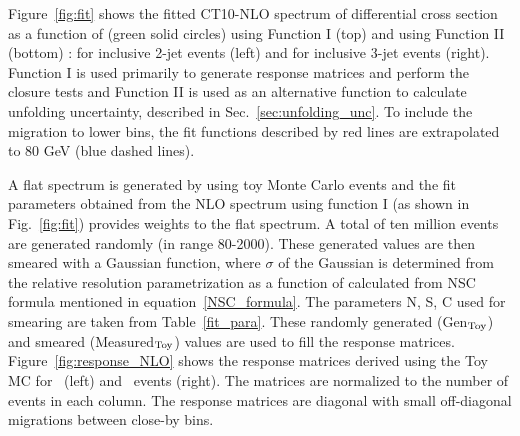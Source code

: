 Figure~\ref{fig:fit} shows the fitted CT10-NLO spectrum of differential cross section as a function of \httwo (green solid circles) using Function I (top) and using Function II (bottom) : for inclusive 2-jet events (left) and for inclusive 3-jet events (right). Function I is used primarily to generate response matrices and perform the closure tests and Function II is used as an alternative function to calculate unfolding uncertainty, described in Sec.~\ref{sec:unfolding_unc}. To include the migration to lower bins, the fit functions described by red lines are extrapolated to 80 GeV (blue dashed lines).

A flat \httwo spectrum is generated by using toy Monte Carlo events and the fit parameters obtained from the NLO spectrum using function I (as shown in Fig.~\ref{fig:fit}) provides weights to the flat spectrum. A total of ten million events are generated randomly (in \httwo range 80-2000). These generated values are then smeared with a Gaussian function, where $\sigma$ of the Gaussian is determined from the relative resolution parametrization as a function of \httwo calculated from NSC formula mentioned in equation~\ref{NSC_formula}. The parameters N, S, C used for smearing are taken from Table~\ref{fit_para}. These randomly generated (Gen$_{\rm Toy}$) and smeared (Measured$_{\rm Toy}$) values are used to fill the response matrices. Figure~\ref{fig:response_NLO} shows the response matrices derived using the Toy MC for \njt~(left) and \njth~events (right). The matrices are normalized to the number of events in each column. The response matrices are diagonal with small off-diagonal migrations between close-by \httwo bins.


